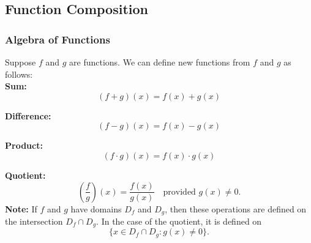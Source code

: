 \subsection{Function Composition}
\begin{frame}
  \frametitle{Algebra of Functions} 
    Suppose \(f\) and \(g\) are functions. We can define new functions from \(f\) and \(g\) as follows: \\
  
  \pause
    \textbf{Sum:}  
    \[
    (f+g)(x) = f(x) + g(x)
    \]
    
    \pause
    \textbf{Difference:}  
    \[
    (f-g)(x) = f(x) - g(x)
    \]
    
    \pause
    \textbf{Product:}  
    \[
    (f\cdot g)(x) = f(x) \cdot g(x)
    \]
    
    \pause
    \textbf{Quotient:}  
    \[
    \left(\frac{f}{g}\right)(x) = \frac{f(x)}{g(x)} \quad \text{provided } g(x) \neq 0.
    \]
    \textbf{Note:} If \(f\) and \(g\) have domains \(D_f\) and \(D_g\), then these operations are defined on the intersection \(D_f \cap D_g\). In the case of the quotient, it is defined on
    \[
    \{x \in D_f \cap D_g : g(x) \neq 0\}.
    \]
    
  \end{frame}

